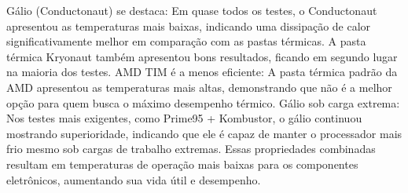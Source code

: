 \documentclass[12pt]{article}
\begin{document}
Gálio (Conductonaut) se destaca: Em quase todos os testes, o Conductonaut apresentou as temperaturas mais baixas, indicando uma dissipação de calor significativamente melhor em comparação com as pastas térmicas.
A pasta térmica Kryonaut também apresentou bons resultados, ficando em segundo lugar na maioria dos testes.
AMD TIM é a menos eficiente: A pasta térmica padrão da AMD apresentou as temperaturas mais altas, demonstrando que não é a melhor opção para quem busca o máximo desempenho térmico.
Gálio sob carga extrema: Nos testes mais exigentes, como Prime95 + Kombustor, o gálio continuou mostrando superioridade, indicando que ele é capaz de manter o processador mais frio mesmo sob cargas de trabalho extremas.
Essas propriedades combinadas resultam em temperaturas de operação mais baixas para os componentes eletrônicos, aumentando sua vida útil e desempenho.
\end{document}
